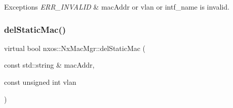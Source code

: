 \begin{DoxyExceptions}{Exceptions}
{\em E\+R\+R\+\_\+\+I\+N\+V\+A\+L\+ID} & mac\+Addr or vlan or intf\+\_\+name is invalid. \\
\hline
\end{DoxyExceptions}
\mbox{\label{classnxos_1_1_nx_mac_mgr_aa8853103d4b94e6153f2b0cc5f130b77}} 
\subsubsection{\texorpdfstring{del\+Static\+Mac()}{delStaticMac()}}
{\footnotesize\ttfamily virtual bool nxos\+::\+Nx\+Mac\+Mgr\+::del\+Static\+Mac (\begin{DoxyParamCaption}\item[{const std\+::string \&}]{mac\+Addr,  }\item[{const unsigned int}]{vlan }\end{DoxyParamCaption})\hspace{0.3cm}{\ttfamily [pure virtual]}}

